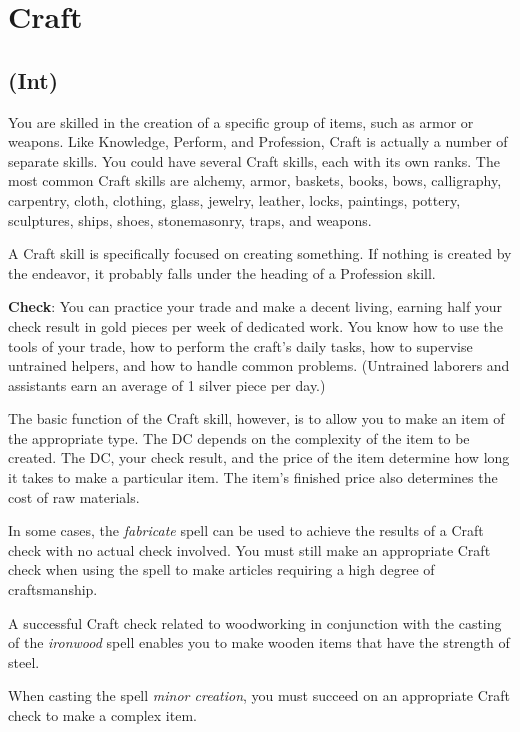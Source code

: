 \section{Craft}

\label{f0}
\subsection{(Int)}

				
You are skilled in the creation of a specific group of items, such as armor or weapons. Like Knowledge, Perform, and Profession, Craft is actually a number of separate skills. You could have several Craft skills, each with its own ranks. The most common Craft skills are alchemy, armor, baskets, books, bows, calligraphy, carpentry, cloth, clothing, glass, jewelry, leather, locks, paintings, pottery, sculptures, ships, shoes, stonemasonry, traps, and weapons.
				
A Craft skill is specifically focused on creating something. If nothing is created by the endeavor, it probably falls under the heading of a Profession skill.
				
\textbf{Check}: You can practice your trade and make a decent living, earning half your check result in gold pieces per week of dedicated work. You know how to use the tools of your trade, how to perform the craft's daily tasks, how to supervise untrained helpers, and how to handle common problems. (Untrained laborers and assistants earn an average of 1 silver piece per day.)
				
The basic function of the Craft skill, however, is to allow you to make an item of the appropriate type. The DC depends on the complexity of the item to be created. The DC, your check result, and the price of the item determine how long it takes to make a particular item. The item's finished price also determines the cost of raw materials.
				
In some cases, the \textit{fabricate }spell can be used to achieve the results of a Craft check with no actual check involved. You must still make an appropriate Craft check when using the spell to make articles requiring a high degree of craftsmanship.
				
A successful Craft check related to woodworking in conjunction with the casting of the \textit{ironwood }spell enables you to make wooden items that have the strength of steel.
				
When casting the spell \textit{minor creation}, you must succeed on an appropriate Craft check to make a complex item.
				
